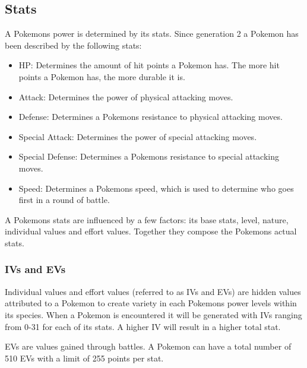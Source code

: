\subsection{Stats}
A Pokemons power is determined by its stats. Since generation 2 a Pokemon has been described by the following stats:
\begin{itemize}
  \item HP: Determines the amount of hit points a Pokemon has. The more hit points a Pokemon has, the more durable it is.
  \item Attack: Determines the power of physical attacking moves.
  \item Defense: Determines a Pokemons resistance to physical attacking moves.
  \item Special Attack: Determines the power of special attacking moves.
  \item Special Defense: Determines a Pokemons resistance to special attacking moves.
  \item Speed: Determines a Pokemons speed, which is used to determine who goes first in a round of battle.
\end{itemize}
A Pokemons stats are influenced by a few factors: its base stats, level, nature, individual values and effort values.
Together they compose the Pokemons actual stats.

\subsubsection{IVs and EVs}
Individual values \cite{IndividualValues} and effort values \cite{EffortValues} (referred to as IVs and EVs) are hidden values attributed to a Pokemon to create variety in each Pokemons power levels within its species.
When a Pokemon is encountered it will be generated with IVs ranging from 0-31 for each of its stats. A higher IV will result in a higher total stat.

EVs are values gained through battles. A Pokemon can have a total number of 510 EVs with a limit of 255 points per stat.

